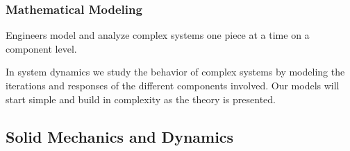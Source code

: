\documentclass[fleqn]{beamer} %
\newcommand{\sectionIIIsubsectionItitle}{Mathematical Modeling}
\newcommand{\sectionIIIsubsectionIItitle}{Solid Mechanics and Dynamics}
\begin{document}
			\begin{frame}
				\frametitle{\sectionIIIsubsectionItitle}
				\bigskip
				Engineers model and analyze complex systems one piece at a time on a component level. \vspc

				In system dynamics we study the behavior of complex systems by modeling the iterations and responses of the different components involved. Our models will start simple and build in complexity as the theory is presented. 
	
				\btVFill
			\end{frame}

		\subsection{\sectionIIIsubsectionIItitle}\label{sectionIIIsubsectionII}	
\end{document}
